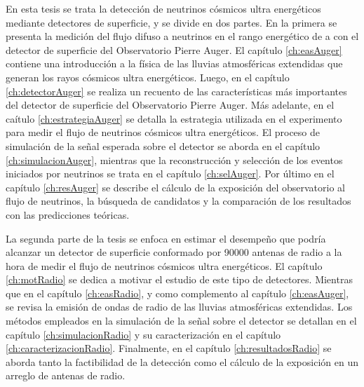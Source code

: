 En esta tesis se trata la detecci\'on de neutrinos c\'osmicos ultra energ\'eticos mediante detectores de superficie, y se divide en dos partes.
En la primera se presenta la medici\'on del flujo difuso a neutrinos en el rango energ\'etico de  a  con el detector de superficie del Observatorio Pierre Auger.
El cap\'itulo \ref{ch:easAuger} contiene una introducci\'on a la f\'isica de las lluvias atmosf\'ericas extendidas que generan los rayos c\'osmicos ultra energ\'eticos. 
Luego, en el cap\'itulo \ref{ch:detectorAuger} se realiza un recuento de las caracter\'isticas m\'as importantes del detector de superficie del Observatorio Pierre Auger.
M\'as adelante, en el ca\'itulo \ref{ch:estrategiaAuger} se detalla la estrategia utilizada en el experimento para medir el flujo de neutrinos c\'osmicos ultra energ\'eticos.
El proceso de simulaci\'on de la se\~nal esperada sobre el detector se aborda en el cap\'itulo \ref{ch:simulacionAuger}, mientras que la reconstrucci\'on y selecci\'on de los eventos iniciados por neutrinos se trata en el cap\'itulo \ref{ch:selAuger}.
Por \'ultimo en el cap\'itulo \ref{ch:resAuger} se describe el c\'alculo de la exposici\'on del observatorio al flujo de neutrinos, la b\'usqueda de candidatos y la comparaci\'on de los resultados con las predicciones te\'oricas.

La segunda parte de la tesis se enfoca en estimar el desempe\~no que podr\'ia alcanzar un detector de superficie conformado por 90000 antenas de radio a la hora de medir el flujo de neutrinos c\'osmicos ultra energ\'eticos.
El cap\'itulo \ref{ch:motRadio} se dedica a motivar el estudio de este tipo de detectores.
Mientras que en el cap\'itulo \ref{ch:easRadio}, y como complemento al cap\'itulo \ref{ch:easAuger}, se revisa la emisi\'on de ondas de radio de las lluvias atmosf\'ericas extendidas.
Los m\'etodos empleados en la simulaci\'on de la se\~nal sobre el detector se detallan en el cap\'itulo \ref{ch:simulacionRadio} y su caracterizaci\'on en el cap\'itulo \ref{ch:caracterizacionRadio}.
Finalmente, en el cap\'itulo \ref{ch:resultadosRadio} se aborda tanto la factibilidad de la detecci\'on como el c\'alculo de la exposici\'on en un arreglo de antenas de radio.

